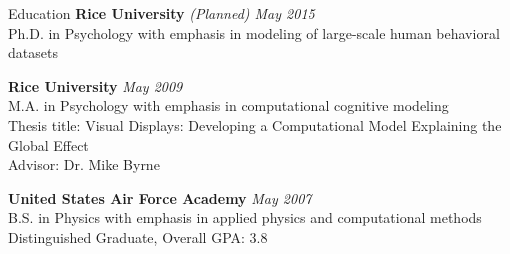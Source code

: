 
\begin{rSection}{Education}
  {\bf Rice University} \hfill {\em (Planned) May 2015} \\
  Ph.D. in Psychology with emphasis in modeling of large-scale human behavioral datasets
\item {\bf Rice University} \hfill {\em May 2009} \\ 
  M.A. in Psychology with emphasis in computational cognitive modeling \\
  Thesis title: Visual Displays: Developing a Computational Model Explaining the Global Effect \\
  Advisor: Dr. Mike Byrne
\item {\bf United States Air Force Academy} \hfill {\em May 2007} \\ 
  B.S. in Physics with emphasis in applied physics and computational methods \\
  Distinguished Graduate, Overall GPA: 3.8 \\
\end{rSection}


